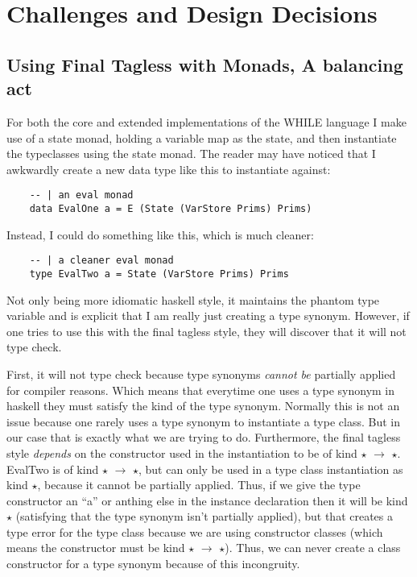 \documentclass[9pt,letterpaper]{extarticle}
\begin{document}
  \section{Challenges and Design Decisions}
  \subsection{Using Final Tagless with Monads, A balancing act}
  For both the core and extended implementations of the WHILE language I make
  use of a state monad, holding a variable map as the state, and then
  instantiate the typeclasses using the state monad. The reader may have noticed
  that I awkwardly create a new data type like this to instantiate against:
  \begin{verbatim}
    -- | an eval monad
    data EvalOne a = E (State (VarStore Prims) Prims)
  \end{verbatim}

  Instead, I could do something like this, which is much cleaner:
  \begin{verbatim}
    -- | a cleaner eval monad
    type EvalTwo a = State (VarStore Prims) Prims
  \end{verbatim}

  Not only being more idiomatic haskell style, it maintains the phantom type
  variable and is explicit that I am really just creating a type synonym.
  However, if one tries to use this with the final tagless style, they will
  discover that it will not type check.

  First, it will not type check because type synonyms \textit{cannot be}
  partially applied for compiler reasons. Which means that everytime one uses a
  type synonym in haskell they must satisfy the kind of the type synonym.
  Normally this is not an issue because one rarely uses a type synonym to
  instantiate a type class. But in our case that is exactly what we are trying
  to do. Furthermore, the final tagless style \textit{depends} on the
  constructor used in the instantiation to be of kind $\star$ $\rightarrow$
  $\star$. EvalTwo is of kind $\star$ $\rightarrow$ $\star$, but can only be
  used in a type class instantiation as kind $\star$, because it cannot be
  partially applied. Thus, if we give the type constructor an ``a'' or anthing
  else in the instance declaration then it will be kind $\star$ (satisfying that
  the type synonym isn't partially applied), but that creates a type error for
  the type class because we are using constructor classes (which means the
  constructor must be kind $\star$ $\rightarrow$ $\star$). Thus, we can never
  create a class constructor for a type synonym because of this incongruity.
\end{document}

